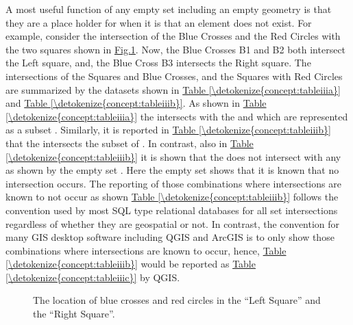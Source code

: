 \documentclass[letterpaper,10pt,english]{sphinxmanual}
\begin{document}
A most useful function of any empty set including an empty geometry is that they are a place holder for when it is  that an element does not exist.  For example, consider the intersection of the Blue Crosses and the Red Circles with the two squares shown in \hyperref[\detokenize{concept:figuresquarepoint}]{Fig.\@ \ref{\detokenize{concept:figuresquarepoint}}}.  Now, the Blue Crosses B1 and B2 both intersect the Left square, and, the Blue Cross B3 intersects the Right square.  The intersections of the Squares and Blue Crosses, and the Squares with Red Circles are summarized by the datasets shown in \hyperref[\detokenize{concept:tableiiia}]{Table \ref{\detokenize{concept:tableiiia}}} and \hyperref[\detokenize{concept:tableiiib}]{Table \ref{\detokenize{concept:tableiiib}}}.  As shown in  \hyperref[\detokenize{concept:tableiiia}]{Table \ref{\detokenize{concept:tableiiia}}} the  intersects with the   and  which are represented as a subset .  Similarly, it is reported in \hyperref[\detokenize{concept:tableiiib}]{Table \ref{\detokenize{concept:tableiiib}}} that the  intersects the subset of  .  In contrast, also in \hyperref[\detokenize{concept:tableiiib}]{Table \ref{\detokenize{concept:tableiiib}}} it is shown that the  does not intersect with any  as shown by the empty set \sphinxstyleemphasis{\{ \}}.  Here the empty set \sphinxstyleemphasis{\{ \}} shows that it is known that no intersection occurs.  The reporting of those combinations where intersections are known to not occur as shown  \hyperref[\detokenize{concept:tableiiib}]{Table \ref{\detokenize{concept:tableiiib}}} follows the convention used by most SQL type relational databases for all set intersections regardless of whether they are geospatial or not.  In contrast, the convention for many GIS desktop software including QGIS and ArcGIS is to only show those combinations where intersections are known to occur, hence, \hyperref[\detokenize{concept:tableiiib}]{Table \ref{\detokenize{concept:tableiiib}}} would be reported as \hyperref[\detokenize{concept:tableiiic}]{Table \ref{\detokenize{concept:tableiiic}}} by QGIS.

\begin{figure}[htbp]
\centering
\capstart

\noindent{}
\caption{The location of blue crosses and red circles in the “Left Square” and the “Right Square”.}\label{\detokenize{concept:id42}}\label{\detokenize{concept:figuresquarepoint}}\end{figure}
\end{document}
